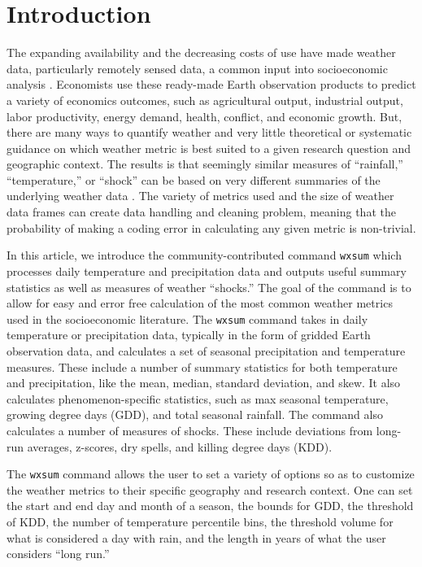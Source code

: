 \section{Introduction}

The expanding availability and the decreasing costs of use have made weather data, particularly remotely sensed data, a common input into socioeconomic analysis \citep{Dell2014-rf, DonaldsonStoreygard16}. Economists use these ready-made Earth observation products to predict a variety of economics outcomes, such as agricultural output, industrial output, labor productivity, energy demand, health, conflict, and economic growth. But, there are many ways to quantify weather and very little theoretical or systematic guidance on which weather metric is best suited to a given research question and geographic context. The results is that seemingly similar measures of ``rainfall,'' ``temperature,'' or ``shock'' can be based on very different summaries of the underlying weather data \citep{MichlerEtAl21WB}. The variety of metrics used and the size of weather data frames can create data handling and cleaning problem, meaning that the probability of making a coding error in calculating any given metric is non-trivial.

In this article, we introduce the community-contributed command \texttt{wxsum} which processes daily temperature and precipitation data and outputs useful summary statistics as well as measures of weather ``shocks.'' The goal of the command is to allow for easy and error free calculation of the most common weather metrics used in the socioeconomic literature. The \texttt{wxsum} command takes in daily temperature or precipitation data, typically in the form of gridded Earth observation data, and calculates a set of seasonal precipitation and temperature measures. These include a number of summary statistics for both temperature and precipitation, like the mean, median, standard deviation, and skew. It also calculates phenomenon-specific statistics, such as max seasonal temperature, growing degree days (GDD), and total seasonal rainfall. The command also calculates a number of measures of shocks. These include deviations from long-run averages, z-scores, dry spells, and killing degree days (KDD).

The \texttt{wxsum} command allows the user to set a variety of options so as to customize the weather metrics to their specific geography and research context. One can set the start and end day and month of a season, the bounds for GDD, the threshold of KDD, the number of temperature percentile bins, the threshold volume for what is considered a day with rain, and the length in years of what the user considers ``long run.''

